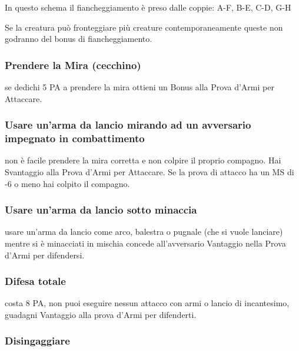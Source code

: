 \documentclass[12pt,a4paper,twoside,openany]{book}
\begin{document}
\begin{multicols}{2}
In questo schema il fiancheggiamento è preso dalle coppie: A-F, B-E, C-D, G-H

\bigskip

Se la creatura può fronteggiare più creature contemporaneamente queste non godranno del bonus di fiancheggiamento.


\subsubsection{Prendere la Mira (cecchino)} \label{cecchino}

se dedichi 5 PA a prendere la mira ottieni un Bonus alla Prova d'Armi per Attaccare.

\subsubsection{Usare un'arma da lancio mirando ad un avversario impegnato in combattimento} \label{usarearmalancioinmischia}

non è facile prendere la mira corretta e non colpire il proprio compagno. Hai Svantaggio alla Prova d'Armi per Attaccare. Se la prova di attacco ha un MS di -6 o meno hai colpito il compagno.

\subsubsection{Usare un'arma da lancio sotto minaccia} \label{usarearmalanciosottominaccia}

usare un'arma da lancio come arco, balestra o pugnale (che si vuole lanciare) mentre si è minacciati in mischia concede all'avversario Vantaggio nella Prova d'Armi per difendersi.

\subsubsection{Difesa totale} \label{difesatotale}

costa 8 PA, non puoi eseguire nessun attacco con armi o lancio di incantesimo, guadagni Vantaggio alla prova d'Armi per difenderti.

\subsubsection{Disingaggiare} \label{disingaggiare}


\end{multicols}
\end{document}
